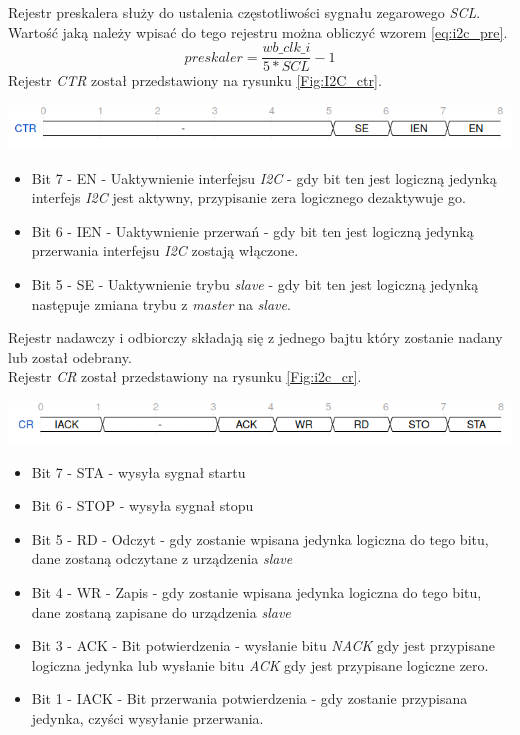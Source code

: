 \documentclass[11pt,a4paper]{article}
\begin{document}
		\\\\Rejestr preskalera służy do ustalenia częstotliwości sygnału zegarowego \textit{SCL}. Wartość jaką należy wpisać do tego rejestru można obliczyć wzorem \ref{eq:i2c_pre}.
\begin{equation} \label{eq:i2c_pre}
					preskaler = \dfrac{wb\_clk\_i}{5*SCL}-1	
\end{equation}
Rejestr \textit{CTR} został przedstawiony na rysunku \ref{Fig:I2C_ctr}.\\
			\begin{minipage}[c]{\textwidth}
					\includegraphics[width=\textwidth]{./rysunki/ctr_i2c.png}
			\end{minipage} 
			\begin{itemize}
				\item Bit 7 - EN - Uaktywnienie interfejsu \textit{I2C} - gdy bit ten jest logiczną jedynką interfejs \textit{I2C} jest aktywny, przypisanie zera logicznego dezaktywuje go.
				\item Bit 6 - IEN - Uaktywnienie przerwań - gdy bit ten jest logiczną jedynką przerwania interfejsu \textit{I2C} zostają włączone.
				\item Bit 5 - SE - Uaktywnienie trybu \textit{slave} - gdy bit ten jest logiczną jedynką następuje zmiana trybu z \textit{master} na \textit{slave}.
			\end{itemize}
			Rejestr nadawczy i odbiorczy składają się z jednego bajtu który zostanie nadany lub został odebrany.\\
			Rejestr \textit{CR} został przedstawiony na rysunku \ref{Fig:i2c_cr}.\\
	\begin{minipage}[c]{\textwidth}
					\includegraphics[width=\textwidth]{./rysunki/cr_i2c.png}
	\end{minipage} 
\begin{itemize}
	\item Bit 7 - STA - wysyła sygnał startu
	\item Bit 6 - STOP - wysyła sygnał stopu
	\item Bit 5 - RD - Odczyt - gdy zostanie wpisana jedynka logiczna do tego bitu, dane zostaną odczytane z urządzenia \textit{slave}
	\item Bit 4 - WR - Zapis - gdy zostanie wpisana jedynka logiczna do tego bitu, dane zostaną zapisane do urządzenia \textit{slave}
	\item Bit 3 - ACK - Bit potwierdzenia - wysłanie bitu \textit{NACK} gdy jest przypisane logiczna jedynka lub wysłanie bitu \textit{ACK} gdy jest przypisane logiczne zero.
	\item Bit 1 - IACK - Bit przerwania potwierdzenia - gdy zostanie przypisana jedynka, czyści wysyłanie przerwania.
\end{itemize}
\end{document}
